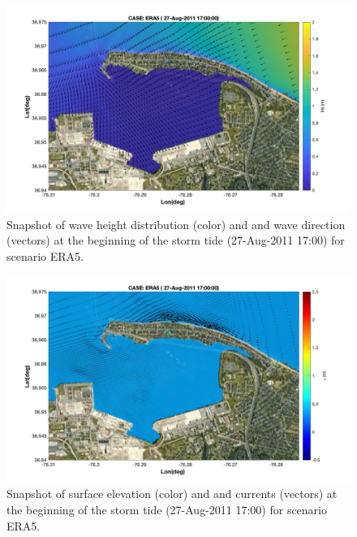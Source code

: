\documentclass[preprint,12pt,authoryear] {elsarticle}
\begin{document}
\begin{figure}
\centering
\includegraphics[width=\textwidth]{./figures/nearcom_hs_ERA5_55.jpg}
\caption{Snapshot of wave height distribution (color) and and wave direction (vectors) at the beginning of the storm tide (27-Aug-2011 17:00) for scenario ERA5.}
\label{ERA5_hs_1}
\centering
\end{figure}

\begin{figure}
\centering
\includegraphics[width=\textwidth]{./figures/nearcom_ele_ERA5_55.jpg}
\caption{Snapshot of surface elevation (color) and and currents (vectors) at the beginning of the storm tide (27-Aug-2011 17:00) for scenario ERA5.}
\label{ERA5_eta_1}
\centering
\end{figure}
\end{document}
